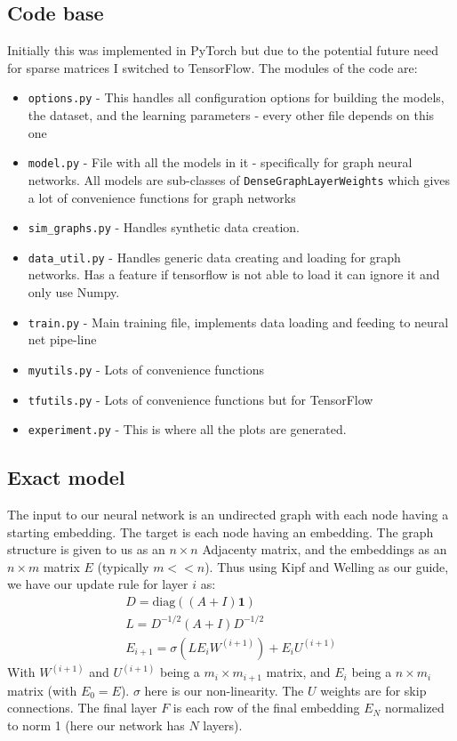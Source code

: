 \documentclass[a4paper]{article}
\begin{document}
\subsection*{Code base}
Initially this was implemented in PyTorch but due to the potential future need for sparse matrices I switched to TensorFlow. The modules of the code are:
\begin{itemize}
\item \texttt{options.py} - This handles all configuration options for building the models, the dataset, and the learning parameters - every other file depends on this one
\item \texttt{model.py} - File with all the models in it - specifically for graph neural networks. All models are sub-classes of \texttt{DenseGraphLayerWeights} which gives a lot of convenience functions for graph networks
\item \texttt{sim\_graphs.py} - Handles synthetic data creation.
\item \texttt{data\_util.py} - Handles generic data creating and loading for graph networks. Has a feature if tensorflow is not able to load it can ignore it and only use Numpy.
\item \texttt{train.py} - Main training file, implements data loading and feeding to neural net pipe-line
\item \texttt{myutils.py} - Lots of convenience functions
\item \texttt{tfutils.py} - Lots of convenience functions but for TensorFlow
\item \texttt{experiment.py} - This is where all the plots are generated. 
\end{itemize}

\subsection*{Exact model}
The input to our neural network is an undirected graph with each node having a starting embedding.
The target is each node having an embedding.
The graph structure is given to us as an $n \times n$ Adjacenty matrix, and the embeddings as an $n \times m$ matrix $E$ (typically $m << n$).
Thus using Kipf and Welling as our guide, we have our update rule for layer $i$ as:
\begin{align*}
D = \mathrm{diag}((A + I) \mathbf{1}) \\
L = D^{-1/2}(A + I)D^{-1/2} \\
E_{i+1} = \sigma \left(LE_{i} W^{(i+1)}\right) + E_{i} U^{(i+1)}
\end{align*}
With $W^{(i+1)}$ and $U^{(i+1)}$ being a $m_i \times m_{i+1}$ matrix, and $E_i$ being a $n \times m_i$ matrix (with $E_0 = E$).
$\sigma$ here is our non-linearity.
The $U$ weights are for skip connections.
The final layer $F$ is each row of the final embedding $E_N$ normalized to norm 1 (here our network has $N$ layers).
\end{document}
